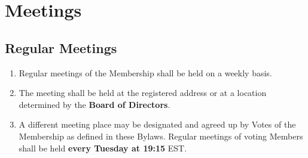\documentclass{article}
\begin{document}
\section{Meetings}
\subsection{Regular Meetings}
\begin{enumerate}
    \item Regular meetings of the Membership shall be held on a weekly basis.
    \item The meeting shall be held at the registered address or at a location determined by the \textbf{Board of Directors}.
    \item A different meeting place may be designated and agreed up by Votes of the Membership as defined in these Bylaws. Regular meetings of voting Members shall be held \textbf{every Tuesday at 19:15} EST.
\end{enumerate}
\end{document}
